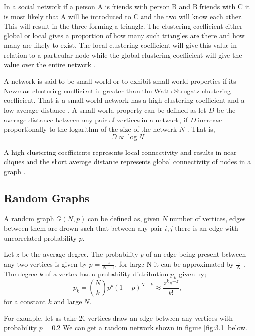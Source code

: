  
In a social network if a person A is friends with person B and B friends with C
it is most likely that A will be introduced to C and the two will know each other. This will result in the three forming a triangle. The clustering coefficient either global or local gives a proportion of how many such triangles are there and how many are likely to exist. The local  clustering coefficient will give this value in relation to a particular node while the global clustering coefficient will give the value over the entire network \citep{estrada2015first}.
 
A network is said to be small world or to exhibit small world properties if its Newman clustering coefficient is greater than the Watts-Strogatz clustering coefficient.
That is a small world network has a high clustering coefficient and a low average distance \citep{estrada2012structure}. A small world property can be defined as let $D$ be the average distance between any pair of vertices in a network, if $D$ increase proportionally to the logarithm of the size of the network $N$   \citep{newman1999scaling}.
That is,
 \begin{equation}
 D \propto \log N
\end{equation}

A high clustering coefficients represents local connectivity and results in near cliques and the short average distance represents global connectivity of nodes in a graph  \citep{Mehlhorn2013}.

 
\subsection{Random Graphs} 
A random graph $G(N,p)$ can be defined as, given  $N$ number of vertices, edges between them are drown such that between any pair $i,j$ there is an edge with uncorrelated probability $p$. 

 Let $z$  be the average degree. The probability $p$ of an edge being present between any two vertices is given by $p = \frac{z}{N-1}$, for large N it can be approximated by $\frac{z}{N}$ \citep{newman2002random}. The degree $k$ of a vertex has a probability distribution $p_k$ given by;
 \begin{equation}
 p_k = \binom{N}{k} p^k (1-p)^{N-k} \approx \frac{z^k e^{-z}}{k!},
\end{equation}
for  a constant $k$ and large $N$.

For example, let us take 20 vertices draw  an edge between any vertices with probability $p = 0.2$ We can get a random network shown in
figure
\ref{fig:3.1} below. 
  
